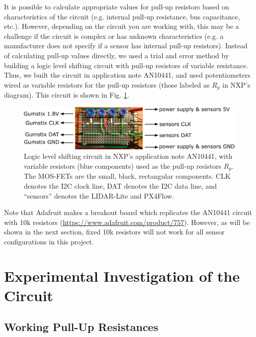 \documentclass[10pt]{article}
\begin{document}
It is possible to calculate appropriate values for pull-up resistors based on characteristics of the circuit (e.g. internal pull-up resistance, bus capacitance, etc.). However, depending on the circuit you are working with, this may be a challenge if the circuit is complex or has unknown characteristics (e.g. a manufacturer does not specify if a sensor has internal pull-up resistors). Instead of calculating pull-up values directly, we used a trial and error method by building a logic level shifting circuit with pull-up resistors of variable resistance. Thus, we built the circuit in application note AN10441, and used potentiometers wired as variable resistors for the pull-up resistors (those labeled as $R_p$ in NXP's diagram). This circuit is shown in Fig. \ref{fig:logic_level_shifing_circuit}.
\begin{figure}[ht]
\centering
\includegraphics[width=1.0\textwidth]{photos/board.pdf}
\caption{Logic level shifting circuit in NXP's application note AN10441, with variable resistors (blue components) used as the pull-up resistors $R_p$. The MOS-FETs are the small, black, rectangular components. CLK denotes the I2C clock line, DAT denotes the I2C data line, and ``sensors'' denotes the LIDAR-Lite and PX4Flow.}
\label{fig:logic_level_shifing_circuit}
\end{figure}
Note that Adafruit makes a breakout board which replicates the AN10441 circuit with 10k resistors (\url{https://www.adafruit.com/product/757}). However, as will be shown in the next section, fixed 10k resistors will not work for all sensor configurations in this project.


\section*{Experimental Investigation of the Circuit}

\subsection*{Working Pull-Up Resistances}
\end{document}
